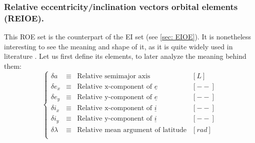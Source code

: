 	\subsubsection{Relative eccentricity/inclination vectors orbital elements (REIOE).} \label{sec:REIOE}
	\indent This ROE set is the counterpart of the EI set (see \ref{sec: EIOE}). It is nonetheless interesting to see the meaning and shape of it, as it is quite widely used in literature \cite{DAmico_Montenbruck, Schaub2004, dAmicoDLR}. Let us first define its elements, to later analyze the meaning behind them:
	\begin{equation}
	\left\{ 
	\begin{array}{llll}
	\delta a 	& \equiv & \text{Relative semimajor axis} & [L]\\
	\delta e_x 	& \equiv & \text{Relative x-component of }\underline{e} & [--]\\
	\delta e_y 	& \equiv & \text{Relative y-component of }\underline{e} & [--]\\
	\delta i_x 	& \equiv & \text{Relative x-component of }\underline{i} & [--]\\
	\delta i_y 	& \equiv & \text{Relative y-component of }\underline{i} & [--]\\
	\delta \lambda & \equiv 	& \text{Relative mean argument of latitude} & [rad]\\
	\end{array}
	\right.
	\label{eq: 	def_REIOE}
	\end{equation}
